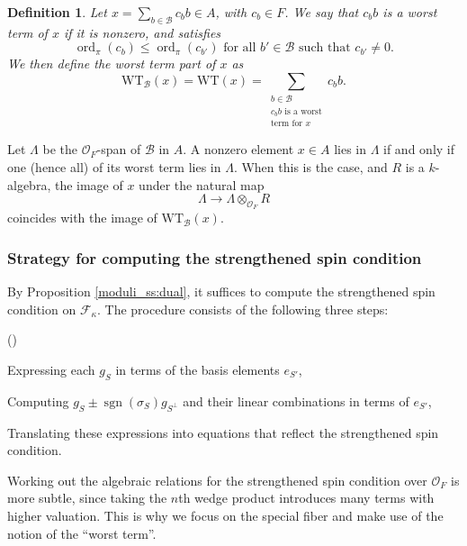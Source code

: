 \documentclass[pdflatex,sn-mathphys-num]{sn-jnl}%
\theoremstyle{thmstyleone}%
\theoremstyle{thmstyletwo}%
\numberwithin{equation}{subsection}
\theoremstyle{thmstylethree}%
\newtheorem{definition}[subsubsection]{Definition}%
\newcommand{\CB}{\ensuremath{\mathcal{B}}\xspace}
\newcommand{\CF}{\ensuremath{\mathcal{F}}\xspace}
\newcommand{\CO}{\ensuremath{\mathcal{O}}\xspace}
\DeclareMathOperator{\ord}{ord}
\DeclareMathOperator{\sgn}{sgn}
\newcommand{\WT}{\text{WT}}
\newenvironment{altenumerate}
	{\begin{list}
			{(\theenumi) }
			{\usecounter{enumi}
				\setlength{\labelwidth}{0pt}
				\setlength{\labelsep}{0pt}
				\setlength{\leftmargin}{0pt}
				\setlength{\itemsep}{\the\smallskipamount}
				\renewcommand{\theenumi}{\roman{enumi}}
		}}
		{\end{list}}
\begin{document}
\begin{definition}\label{equ_ss-setup:wt-def}
	Let $x=\sum_{b\in \CB}c_b b\in A$, with $c_b\in F$. 
	We say that $c_b b$ is a \emph{worst term} of $x$ if it is nonzero, and satisfies
	\begin{equation*}
		\ord_\pi(c_b)\leq \ord_\pi (c_{b'})\text{ for all }b'\in \CB \text{ such that } c_{b'}\neq 0.
	\end{equation*}
	We then define the \emph{worst term part} of $x$ as
	\begin{equation*}
		\WT_\CB(x)=\WT(x)=\sum_{\substack{b \in \CB\\ c_b b \text{ is a worst}\\ \text{term for } x}}c_b b.
	\end{equation*}
\end{definition}
		
Let $\Lambda$ be the $\CO_F$-span of $\CB$ in $A$. A nonzero element $x\in A$ lies in $\Lambda$ if and only if one (hence all) of its worst term lies in $\Lambda$.
When this is the case, and $R$ is a $k$-algebra, the image of $x$ under the natural map
\begin{equation*}
	\Lambda\rightarrow \Lambda\otimes_{\CO_F}R
\end{equation*} 
coincides with the image of $\WT_\CB(x)$.
		
		
		
		
\subsubsection{Strategy for computing the strengthened spin condition}
By Proposition \ref{moduli_ss:dual}, it suffices to compute the strengthened spin condition on $\CF_{\kappa}$. The procedure consists of the following three steps:
\begin{altenumerate}
	\item Expressing each $g_S$ in terms of the basis elements $e_{S'}$,
	\item Computing $g_S\pm\sgn(\sigma_S)g_{S^\perp}$ and their linear combinations in terms of $e_{S'}$,
	\item Translating these expressions into equations that reflect the strengthened spin condition.
\end{altenumerate}
Working out the algebraic relations for the strengthened spin condition over  $\CO_F$ is more subtle, since taking the $n$th wedge product introduces many terms with higher valuation.
This is why we focus on the special fiber and make use of the notion of the ``worst term''.
		
\end{document}
